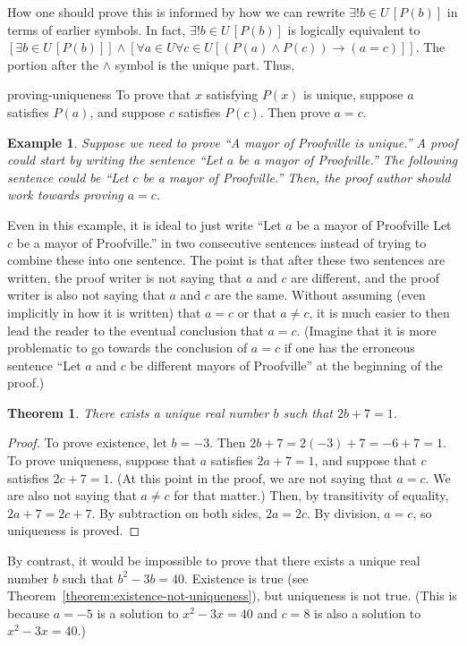 \documentclass{book}
\newcounter{ekcounter}%
\theoremstyle{ekimcustom}
\newtheorem{theorem}[ekcounter]{Theorem}
\newtheorem{example}[ekcounter]{Example}
\begin{document}
How one should prove this is informed by how we can rewrite $\exists ! b \in U\,[P(b)]$ in terms of earlier symbols. In fact, $\exists ! b \in U\,[P(b)]$ is logically equivalent to $[\exists b \in U\,[P(b)]] \wedge [\forall a \in U \forall c \in U [(P(a) \wedge P(c)) \rightarrow (a=c)]]$. The portion after the $\wedge$ symbol is the unique part. Thus,
\begin{bmethod}{}{proving-uniqueness}
To prove that $x$ satisfying $P(x)$ is unique, suppose $a$ satisfies $P(a)$, and suppose $c$ satisfies $P(c)$. Then prove $a=c$.
\end{bmethod}

\begin{example}
Suppose we need to prove ``A mayor of Proofville is unique.'' A proof could start by writing the sentence ``Let $a$ be a mayor of Proofville.'' The following sentence could be ``Let $c$ be a mayor of Proofville.'' Then, the proof author should work towards proving $a=c$.
\end{example}
Even in this example, it is ideal to just write ``Let $a$ be a mayor of Proofville Let $c$ be a mayor of Proofville.'' in two consecutive sentences instead of trying to combine these into one sentence. The point is that after these two sentences are written, the proof writer is not saying that $a$ and $c$ are different, and the proof writer is also not saying that $a$ and $c$ are the same. Without assuming (even implicitly in how it is written) that $a=c$ or that $a\not=c$, it is much easier to then lead the reader to the eventual conclusion that $a=c$. (Imagine that it is more problematic to go towards the conclusion of $a=c$ if one has the erroneous sentence ``Let $a$ and $c$ be different mayors of Proofville'' at the beginning of the proof.)

\begin{theorem}
There exists a unique real number $b$ such that $2b+7=1$.
\end{theorem}
\begin{proof}
To prove existence, let $b=-3$. Then $2b+7=2(-3)+7=-6+7=1$. To prove uniqueness, suppose that $a$ satisfies $2a+7=1$, and suppose that $c$ satisfies $2c+7=1$. (At this point in the proof, we are not saying that $a=c$. We are also not saying that $a \not= c$ for that matter.) Then, by transitivity of equality, $2a+7=2c+7$. By subtraction on both sides, $2a=2c$. By division, $a=c$, so uniqueness is proved.
\end{proof}
By contrast, it would be impossible to prove that there exists a unique real number $b$ such that $b^2-3b=40$. Existence is true (see Theorem~\ref{theorem:existence-not-uniqueness}), but uniqueness is not true. (This is because $a=-5$ is a solution to $x^2-3x=40$ and $c=8$ is also a solution to $x^2-3x=40$.)
\end{document}
